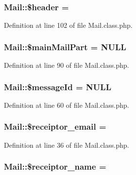 \subsubsection[{\$header}]{\setlength{\rightskip}{0pt plus 5cm}Mail\+::\$header = \textquotesingle{}\textquotesingle{}}\label{classMail_ace98431d0944d23544743094b443d506}


Definition at line 102 of file Mail.\+class.\+php.

\hypertarget{classMail_ad58544ae1c34119ec852e3c22b855624}{}
\subsubsection[{\$main\+Mail\+Part}]{\setlength{\rightskip}{0pt plus 5cm}Mail\+::\$main\+Mail\+Part = N\+U\+L\+L}\label{classMail_ad58544ae1c34119ec852e3c22b855624}


Definition at line 90 of file Mail.\+class.\+php.

\hypertarget{classMail_a48caf58883e736f50ab87a03147c584a}{}
\subsubsection[{\$message\+Id}]{\setlength{\rightskip}{0pt plus 5cm}Mail\+::\$message\+Id = N\+U\+L\+L}\label{classMail_a48caf58883e736f50ab87a03147c584a}


Definition at line 60 of file Mail.\+class.\+php.

\hypertarget{classMail_aa034785886f8bdcf3a5ed9c86ce8ed14}{}
\subsubsection[{\$receiptor\+\_\+email}]{\setlength{\rightskip}{0pt plus 5cm}Mail\+::\$receiptor\+\_\+email = \textquotesingle{}\textquotesingle{}}\label{classMail_aa034785886f8bdcf3a5ed9c86ce8ed14}


Definition at line 36 of file Mail.\+class.\+php.

\hypertarget{classMail_a44df4937f3c8b2691e9bbb1220c667f3}{}
\subsubsection[{\$receiptor\+\_\+name}]{\setlength{\rightskip}{0pt plus 5cm}Mail\+::\$receiptor\+\_\+name = \textquotesingle{}\textquotesingle{}}\label{classMail_a44df4937f3c8b2691e9bbb1220c667f3}


